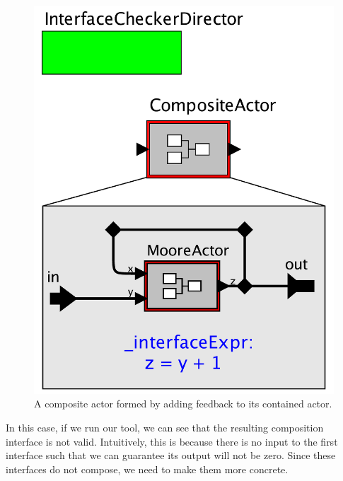 \documentclass[preprint,11pt]{sigplanconf}
\begin{document}
\begin{figure}[htbp]
\centering
\includegraphics[width=\columnwidth]{figs/feedbackComp} 
\caption{A composite actor formed by adding feedback to its contained actor.}
\label{fig:feedbackComp}
\end{figure}

In this case, if we run our tool, we can see that the resulting composition
interface is not valid.
Intuitively, this is because there is no input to the first interface such
that we can guarantee its output will not be zero.
Since these interfaces do not compose, we need to make them more concrete.
\end{document}
